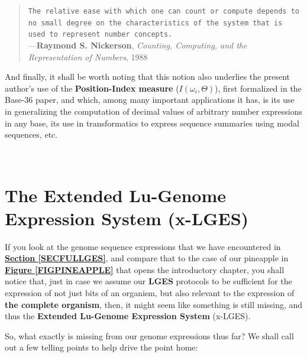 \documentclass[a4paper, 18pt]{book} %
\begin{document}
\begin{center}
{\begin{minipage}{0.9\textwidth}
\begin{quotation}
\noindent \texttt{The relative ease with which one can count or compute depends to no small degree on the characteristics of the system that is used to represent number concepts.}\\

\hspace*{\fill} ---\textbf{Raymond S. Nickerson}, \textit{Counting, Computing, and the Representation of Numbers}, 1988\cite{nickerson1988counting}
\end{quotation}

And finally, it shall be worth noting that this notion also underlies the present author's use of the \textbf{Position-Index measure} ($I(\omega_i, \Theta)$), first formalized in the Base-36 paper\cite{base36paper}, and which, among many important applications it has, is its use in generalizing the computation of decimal values of arbitrary number expressions in any base, its use in transformatics to express sequence summaries using modal sequences\cite{transformatics}, etc.

\end{minipage}}
\\
\end{center}


\section{The Extended Lu-Genome Expression System (x-LGES)}
\label{SECxLGES}

If you look at the genome sequence expressions that we have encountered in \textbf{\hyperref[SECFULLGES]{Section \ref{SECFULLGES}}}, and compare that to the case of our pineapple in \textbf{\hyperref[FIGPINEAPPLE]{Figure \ref{FIGPINEAPPLE}}} that opens the introductory chapter, you shall notice that, just in case we assume our \textbf{LGES} protocols to be sufficient for the expression of not just bits of an organism, but also relevant to the expression of \textbf{the complete organism}, then, it might seem like something is still missing, and thus the \textbf{Extended Lu-Genome Expression System} (x-LGES).


So, what exactly is missing from our genome expressions thus far? We shall call out a few telling points to help drive the point home:
\end{document}
